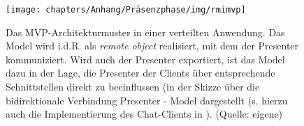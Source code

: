 \begin{figure}
    \centering
    \texttt{[image: chapters/Anhang/Präsenzphase/img/rmimvp]}
    \caption{Das MVP-Architekturmuster in einer verteilten Anwendung. Das Model wird i.d.R. als \textit{remote object} realisiert, mit dem der Presenter kommuniziert.
    Wird auch der Presenter exportiert, ist das Model dazu in der Lage, die Presenter der Clients über entsprechende Schnittstellen direkt zu beeinflussen (in der Skizze über die bidirektionale Verbindung Presenter - Model dargestellt (s. hierzu auch die Implementierung des Chat-Clients in \cite[349, Bild 6.12]{Oec22}). (Quelle: eigene)}
    \label{fig:rmimvp}
\end{figure}
